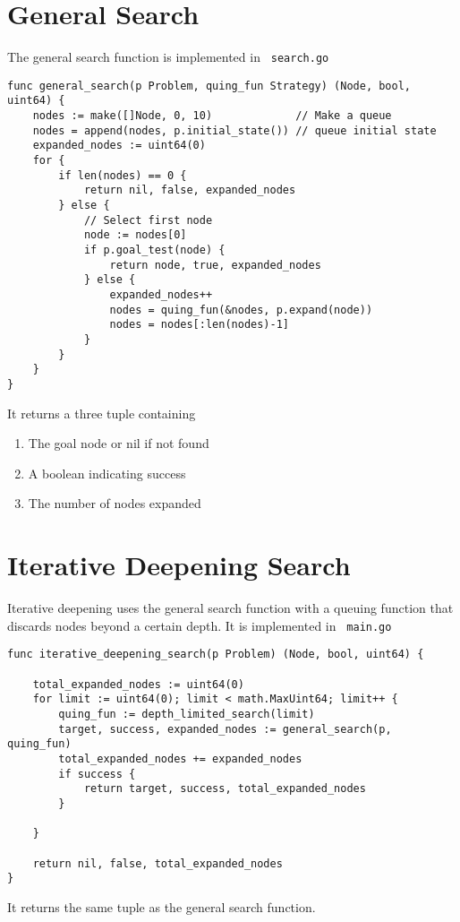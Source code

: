 \documentclass[14pt,a4paper]{report}
\begin{document}
\section{General Search}
The general search function is implemented in \verb+ search.go+
\begin{lstlisting}
func general_search(p Problem, quing_fun Strategy) (Node, bool, uint64) {
    nodes := make([]Node, 0, 10)             // Make a queue
    nodes = append(nodes, p.initial_state()) // queue initial state
    expanded_nodes := uint64(0)
    for {
        if len(nodes) == 0 {
            return nil, false, expanded_nodes
        } else {
            // Select first node
            node := nodes[0]
            if p.goal_test(node) {
                return node, true, expanded_nodes
            } else {
                expanded_nodes++
                nodes = quing_fun(&nodes, p.expand(node))
                nodes = nodes[:len(nodes)-1]
            }
        }
    }
}
\end{lstlisting}
It returns a three tuple containing
\begin{enumerate}
\item The goal node or nil if not found
\item A boolean indicating success
\item The number of nodes expanded
\end{enumerate}
\section{Iterative Deepening Search}
Iterative deepening uses the general search function with a queuing function that discards
nodes beyond a certain depth. It is implemented in \verb+ main.go +
\begin{lstlisting}
func iterative_deepening_search(p Problem) (Node, bool, uint64) {

    total_expanded_nodes := uint64(0)
    for limit := uint64(0); limit < math.MaxUint64; limit++ {
        quing_fun := depth_limited_search(limit)
        target, success, expanded_nodes := general_search(p, quing_fun)
        total_expanded_nodes += expanded_nodes
        if success {
            return target, success, total_expanded_nodes
        }

    }

    return nil, false, total_expanded_nodes
}
\end{lstlisting}

It returns the same tuple as the general search function.
\end{document}
